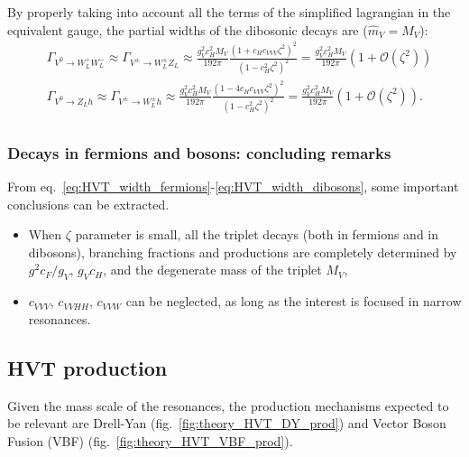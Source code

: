 By properly taking into account all the terms of the simplified lagrangian in the equivalent gauge, the partial widths of the dibosonic decays are ($\hat{m}_V = M_V$):
\begin{equation}
\begin{split}
 & \Gamma_{V^0 \rightarrow W^+_L W^-_L} \approx \Gamma_{V^{\pm} \rightarrow W^{\pm}_L Z_L} \approx \frac{g_V^2 c_H^2 M_V}{192 \pi} \frac{ \left( 1 + c_H c_{VVV} \zeta^2 \right)^2 }{ \left( 1 - c_H^2 \zeta^2\right)^2 } = \frac{g_V^2 c_H^2 M_V}{192 \pi} \left( 1 + \mathcal{O}(\zeta^2) \right)\\
 & \Gamma_{V^0 \rightarrow Z_L h} \approx \Gamma_{V^{\pm} \rightarrow W^{\pm}_L h} \approx \frac{g_V^2 c_H^2 M_V}{192 \pi} \frac{ \left( 1 - 4 c_H c_{VVV} \zeta^2 \right)^2 }{ \left( 1 - c_H^2 \zeta^2\right)^2 } = \frac{g_V^2 c_H^2 M_V}{192 \pi} \left( 1 + \mathcal{O}(\zeta^2) \right).\\
\end{split}
\label{eq:HVT_width_dibosons}
\end{equation}

\subsubsection{Decays in fermions and bosons: concluding remarks}
\label{sec:theory_remarks}
From eq.~\ref{eq:HVT_width_fermions}-\ref{eq:HVT_width_dibosons}, some important conclusions can be extracted.
\begin{itemize}
\item When $\zeta$ parameter is small, all the triplet decays (both in fermions and in dibosons), branching fractions and productions are completely determined by $g^2 c_F /g_V$, $g_V c_H$, and the degenerate mass of the triplet $M_V$,
\item $c_{VVV}$, $c_{VVHH}$, $c_{VVW}$ can be neglected, as long as the interest is focused in narrow resonances.
\end{itemize}

\subsection{HVT production}
\label{sec:theory_widths}
Given the mass scale of the resonances, the production mechanisms expected to be relevant are Drell-Yan (fig.~\ref{fig:theory_HVT_DY_prod}) and Vector Boson Fusion (VBF) (fig.~\ref{fig:theory_HVT_VBF_prod}).

